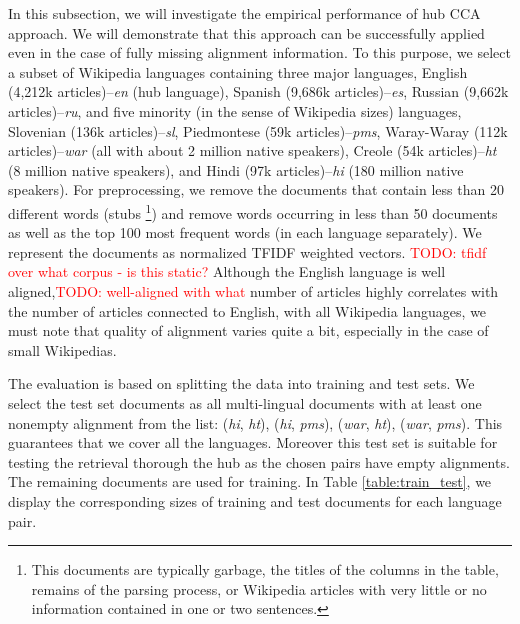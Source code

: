 \documentclass[twoside,11pt]{article}
\newcommand{\todo}[1]{\textcolor{red}{TODO: #1}}
\begin{document}
 In this subsection, we will investigate the empirical performance of hub CCA approach. We will demonstrate that this approach can be successfully applied even in the case of fully missing alignment information.
 To this purpose, we select a subset of Wikipedia languages containing three major languages, English (4,212k articles)--\emph{en} (hub language), Spanish (9,686k articles)--\emph{es}, Russian (9,662k articles)--\emph{ru}, and five minority (in the sense of Wikipedia sizes) languages, Slovenian (136k articles)--\emph{sl}, Piedmontese (59k articles)--\emph{pms}, Waray-Waray (112k articles)--\emph{war} (all with about 2 million native speakers), Creole (54k articles)--\emph{ht} (8 million native speakers), and Hindi (97k articles)--\emph{hi} (180 million native speakers). For preprocessing, we remove the documents that contain less than 20 different words (stubs \footnote{This documents are typically garbage, the titles of the columns in the table, remains of the parsing process, or Wikipedia articles with very little or no information contained in one or two sentences.}) and remove words occurring in less than 50 documents as well as the top 100 most frequent words (in each language separately). We represent the documents as normalized TFIDF\cite{Salton88term-weightingapproaches} weighted vectors.
 \todo{tfidf over what corpus  - is this static?}
 Although the English language is well aligned,\todo{well-aligned with what} number of articles highly correlates with the
    number of articles connected to English, with all Wikipedia languages, we must note that quality of alignment varies quite a bit, especially in the case of small Wikipedias.


The evaluation is based on splitting the data into training and test sets. %
We select the test set documents as all multi-lingual documents with at least one nonempty alignment from the list: (\emph{hi}, \emph{ht}), (\emph{hi}, \emph{pms}), (\emph{war}, \emph{ht}), (\emph{war}, \emph{pms}). This guarantees that we cover all the languages. Moreover this test set is suitable for testing the retrieval thorough the hub as the chosen pairs have empty alignments. The remaining documents are used for training. In Table \ref{table:train_test}, we display the corresponding sizes of training and test documents for each language pair.
\end{document}

